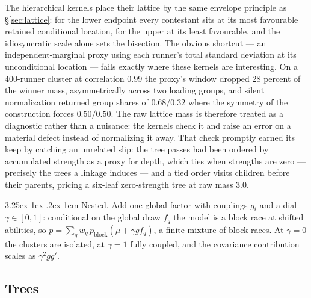 \documentclass[11pt]{article}
\makeatletter
\renewcommand\paragraph{\@startsection{paragraph}{4}{\z@}%
  {3.25ex \@plus1ex \@minus.2ex}{-1em}%
  {\normalfont\normalsize\itshape}}
\makeatother
\begin{document}
The hierarchical kernels place their lattice by the same envelope
principle as \S\ref{sec:lattice}: for the lower endpoint every
contestant sits at its most favourable retained conditional location,
for the upper at its least favourable, and the idiosyncratic scale
alone sets the bisection. The obvious shortcut --- an
independent-marginal proxy using each runner's total standard deviation
at its unconditional location --- fails exactly where these kernels are
interesting. On a $400$-runner cluster at correlation $0.99$ the
proxy's window dropped $28$ percent of the winner mass, asymmetrically
across two loading groups, and silent normalization returned group
shares of $0.68/0.32$ where the symmetry of the construction forces
$0.50/0.50$. The raw lattice mass is therefore treated as a diagnostic
rather than a nuisance: the kernels check it and raise an error on a
material defect instead of normalizing it away. That check promptly
earned its keep by catching an unrelated slip: the tree passes had been
ordered by accumulated strength as a proxy for depth, which ties when
strengths are zero --- precisely the trees a linkage induces --- and a
tied order visits children before their parents, pricing a six-leaf
zero-strength tree at raw mass $3.0$.

\paragraph{Nested.} Add one global factor with couplings $g_i$ and a dial
$\gamma\in[0,1]$: conditional on the global draw $f_q$ the model is a block race
at shifted abilities, so
$p=\sum_q w_q\,p_{\mathrm{block}}(\mu+\gamma g f_q)$, a finite mixture of block
races. At $\gamma=0$ the clusters are isolated, at $\gamma=1$ fully
coupled, and the covariance contribution scales as $\gamma^{2}gg'$.

\subsection{Trees}\label{sec:tree}
\end{document}
